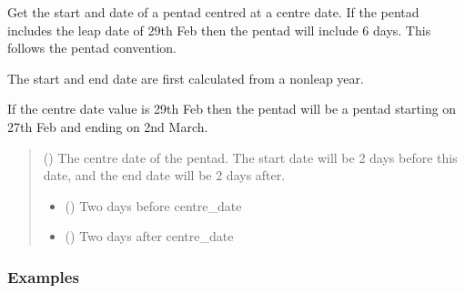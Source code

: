 \documentclass[letterpaper,10pt,english]{sphinxmanual}
\begin{document}
\begin{fulllineitems}
\label{\detokenize{misc:glomar_gridding.utils.get_pentad_range}}
\pysigstartsignatures
\pysiglinewithargsret
{}
{}
{}
\pysigstopsignatures
\sphinxAtStartPar
Get the start and date of a pentad centred at a centre date. If the
pentad includes the leap date of 29th Feb then the pentad will include
6 days. This follows the \sphinxstylestrong{*} pentad convention.

\sphinxAtStartPar
The start and end date are first calculated from a non\sphinxhyphen{}leap year.

\sphinxAtStartPar
If the centre date value is 29th Feb then the pentad will be a pentad
starting on 27th Feb and ending on 2nd March.
\begin{quote}\begin{description}
\sphinxAtStartPar
{} () \textendash{} The centre date of the pentad. The start date will be 2 days before this
date, and the end date will be 2 days after.

\sphinxAtStartPar
{}

\sphinxAtStartPar
\begin{itemize}
\item {}
\sphinxAtStartPar
{} () \textendash{} Two days before centre\_date

\item {}
\sphinxAtStartPar
{} () \textendash{} Two days after centre\_date

\end{itemize}


\end{description}\end{quote}
\subsubsection*{Examples}

\begin{sphinxVerbatim}[commandchars=\\\{\}]
  
\end{sphinxVerbatim}

\end{fulllineitems}
\end{document}
